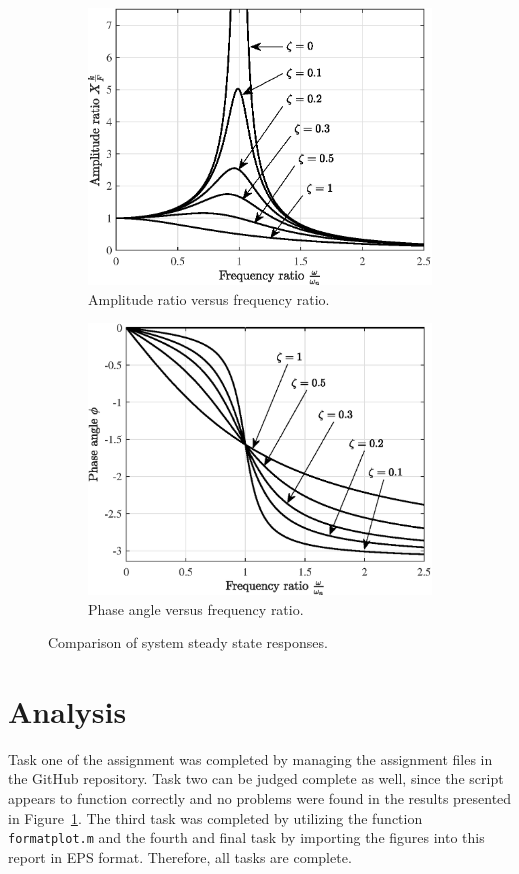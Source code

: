 \documentclass{article}
\begin{document}
	\begin{figure}[htb]
		\centering
		\begin{subfigure}[t]{0.49\textwidth}
			\includegraphics[width=\textwidth]{amplitude.eps}
			\caption{Amplitude ratio versus frequency ratio.}
		\end{subfigure}
		\begin{subfigure}[t]{0.49\textwidth}
			\includegraphics[width=\textwidth]{phaseangle.eps}
			\caption{Phase angle versus frequency ratio.}
		\end{subfigure}
		\caption{Comparison of system steady state responses.}
		\label{fig:steadystate}
	\end{figure}

	\section*{Analysis}
	Task one of the assignment was completed by managing the assignment files in the GitHub repository. Task two can be judged complete as well, since the script appears to function correctly and no problems were found in the results presented in Figure~\ref*{fig:steadystate}. The third task was completed by utilizing the function \texttt{formatplot.m} and the fourth and final task by importing the figures into this report in EPS format. Therefore, all tasks are complete.
	
\end{document}
